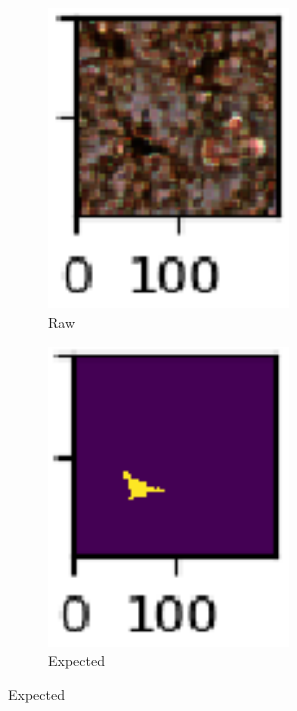 \documentclass{article}
\begin{document}
\begin{figure}[ht]
  \begin{subfigure}{0.2\textwidth}
    \includegraphics[width=0.7\textwidth]{training-sample-raw.png}
    \centering
    \caption{Raw}
  \end{subfigure}%
  \begin{subfigure}{0.2\textwidth}
    \includegraphics[width=0.7\textwidth]{training-sample-seg.png}
    \centering
    \caption{Expected}

\end{subfigure}
\end{figure}
\end{document}
